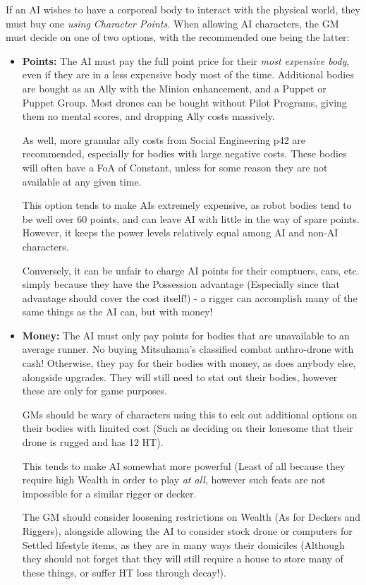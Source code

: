 \begin{multicols*}{3}
	If an AI wishes to have a corporeal body to interact with the physical world, they must buy one \textit{using Character Points.} When allowing AI characters, the GM must decide on one of two options, with the recommended one being the latter:
	\begin{itemize}
		\item \textbf{Points: } The AI must pay the full point price for their \textit{most expensive body}, even if they are in a less expensive body most of the time. Additional bodies are bought as an Ally with the Minion enhancement, and a Puppet or Puppet Group. Most drones can be bought without Pilot Programs, giving them no mental scores, and dropping Ally costs massively. 
		
		As well, more granular ally costs from Social Engineering p42 are recommended, especially for bodies with large negative costs. These bodies will often have a FoA of Constant, unless for some reason they are not available at any given time. 
		
		This option tends to make AIs extremely expensive, as robot bodies tend to be well over 60 points, and can leave AI with little in the way of spare points. However, it keeps the power levels relatively equal among AI and non-AI characters. 
		
		Conversely, it can be unfair to charge AI points for their comptuers, cars, etc. simply because they have the Possession advantage (Especially since that advantage should cover the cost itself!) - a rigger can accomplish many of the same things as the AI can, but with money!
		
		\item \textbf{Money: } The AI must only pay points for bodies that are unavailable to an average runner. No buying Mitsuhama's classified combat anthro-drone with cash! Otherwise, they pay for their bodies with money, as does anybody else, alongside upgrades. They will still need to stat out their bodies, however these are only for game purposes. 
		
		GMs should be wary of characters using this to eek out additional options on their bodies with limited cost (Such as deciding on their lonesome that their drone is rugged and has 12 HT). 
		
		This tends to make AI somewhat more powerful (Least of all because they require high Wealth in order to play \textit{at all}, however such feats are not impossible for a similar rigger or decker. 
		
		The GM should consider loosening restrictions on Wealth (As for Deckers and Riggers), alongside allowing the AI to consider stock drone or computers for Settled lifestyle items, as they are in many ways their domiciles (Although they should not forget that they will still require a house to store many of these things, or suffer HT loss through decay!).
		

\end{itemize}
\end{multicols*}
